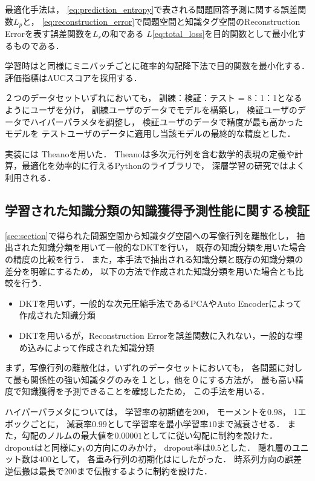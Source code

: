 最適化手法は，
\ref{eq:prediction_entropy}で表される問題回答予測に関する誤差関数$L_p$と，
\ref{eq:reconstruction_error}で問題空間と知識タグ空間のReconstruction Errorを表す誤差関数を$L_r$の和である
$L$\ref{eq:total_loss}を目的関数として最小化するものである．

学習時は\cite{piech2015deep}と同様にミニバッチごとに確率的勾配降下法で目的関数を最小化する．
評価指標はAUCスコアを採用する．

２つのデータセットいずれにおいても，
訓練：検証：テスト = 8：1：1となるようにユーザを分け，
訓練ユーザのデータでモデルを構築し，
検証ユーザのデータでハイパーパラメタを調整し， 
検証ユーザのデータで精度が最も高かったモデルを
テストユーザのデータに適用し当該モデルの最終的な精度とした．

実装には
Theanoを用いた\cite{bergstra+al:2010-scipy,Bastien-Theano-2012}．
Theanoは多次元行列を含む数学的表現の定義や計算，最適化を効率的に行えるPythonのライブラリで，
深層学習の研究ではよく利用される．


\subsection{学習された知識分類の知識獲得予測性能に関する検証}

\ref{sec:section}で得られた問題空間から知識タグ空間への写像行列を離散化し，
抽出された知識分類を用いて一般的なDKTを行い，
既存の知識分類を用いた場合の精度の比較を行う．
また，本手法で抽出される知識分類と既存の知識分類の差分を明確にするため，
以下の方法で作成された知識分類を用いた場合とも比較を行う．
\begin{itemize}
\item DKTを用いず，一般的な次元圧縮手法であるPCAやAuto Encoderによって作成された知識分類
\item DKTを用いるが，Reconstruction Errorを誤差関数に入れない，一般的な埋め込みによって作成された知識分類
\end{itemize}


まず，写像行列の離散化は，いずれのデータセットにおいても，
各問題に対して最も関係性の強い知識タグのみを１とし，他を０にする方法が，
最も高い精度で知識獲得を予測できることを確認したため，
この手法を用いる．

ハイパーパラメタについては，
学習率の初期値を$200$，
モーメントを$0.98$，
1エポックごとに，
減衰率$0.99$として学習率を最小学習率$10$まで減衰させる．
また，勾配のノルムの最大値を$0.00001$として\cite{pascanu2013difficulty}に従い勾配に制約を設けた．
dropoutは\cite{piech2015deep}と同様に${\bf y}_t$の方向にのみかけ，
dropout率は$0.5$とした．
隠れ層のユニット数は$400$として，
各重み行列の初期化は\cite{glorot2010understanding}にしたがった．
時系列方向の誤差逆伝搬は最長で$200$まで伝搬するように制約を設けた．

